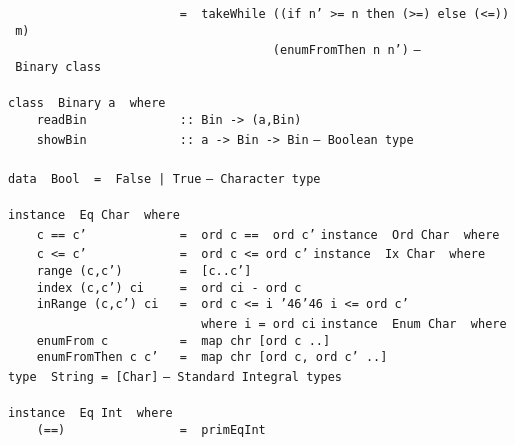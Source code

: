 \mbox{\tt \ \ \ \ \ \ \ \ \ \ \ \ \ \ \ \ \ \ \ \ \ \ \ \ =\ \ takeWhile\ ((if\ n'\ >=\ n\ then\ (>=)\ else\ (<=))\ m)}\\
\mbox{\tt \ \ \ \ \ \ \ \ \ \ \ \ \ \ \ \ \ \ \ \ \ \ \ \ \ \ \ \ \ \ \ \ \ \ \ \ \ (enumFromThen\ n\ n')}
\eprogB\noindent\bprogB
\mbox{\tt --\ Binary\ class}\\
\mbox{\tt }\\
\mbox{\tt class\ \ Binary\ a\ \ where}\\
\mbox{\tt \ \ \ \ readBin\ \ \ \ \ \ \ \ \ \ \ \ \ ::\ Bin\ ->\ (a,Bin)}\\
\mbox{\tt \ \ \ \ showBin\ \ \ \ \ \ \ \ \ \ \ \ \ ::\ a\ ->\ Bin\ ->\ Bin}
\eprogB\noindent\bprogB
\mbox{\tt --\ Boolean\ type}\\
\mbox{\tt }\\
\mbox{\tt data\ \ Bool\ \ =\ \ False\ |\ True}
\eprogB\noindent\bprogB
\mbox{\tt --\ Character\ type}\\
\mbox{\tt }\\
\mbox{\tt instance\ \ Eq\ Char\ \ where}\\
\mbox{\tt \ \ \ \ c\ ==\ c'\ \ \ \ \ \ \ \ \ \ \ \ \ =\ \ ord\ c\ ==\ \ ord\ c'}
\eprogB\noindent\bprogB
\mbox{\tt instance\ \ Ord\ Char\ \ where}\\
\mbox{\tt \ \ \ \ c\ <=\ c'\ \ \ \ \ \ \ \ \ \ \ \ \ =\ \ ord\ c\ <=\ ord\ c'}
\eprogB\noindent\bprogB
\mbox{\tt instance\ \ Ix\ Char\ \ where}\\
\mbox{\tt \ \ \ \ range\ (c,c')\ \ \ \ \ \ \ \ =\ \ [c..c']}\\
\mbox{\tt \ \ \ \ index\ (c,c')\ ci\ \ \ \ \ =\ \ ord\ ci\ -\ ord\ c}\\
\mbox{\tt \ \ \ \ inRange\ (c,c')\ ci\ \ \ =\ \ ord\ c\ <=\ i\ {\char'46}{\char'46}\ i\ <=\ ord\ c'}\\
\mbox{\tt \ \ \ \ \ \ \ \ \ \ \ \ \ \ \ \ \ \ \ \ \ \ \ \ \ \ \ where\ i\ =\ ord\ ci}
\eprogB\noindent\bprogB
\mbox{\tt instance\ \ Enum\ Char\ \ where}\\
\mbox{\tt \ \ \ \ enumFrom\ c\ \ \ \ \ \ \ \ \ \ =\ \ map\ chr\ [ord\ c\ ..]}\\
\mbox{\tt \ \ \ \ enumFromThen\ c\ c'\ \ \ =\ \ map\ chr\ [ord\ c,\ ord\ c'\ ..]}
\eprogB\noindent\bprogB
\mbox{\tt type\ \ String\ =\ [Char]}
\eprogB\noindent\bprogB
\mbox{\tt --\ Standard\ Integral\ types}\\
\mbox{\tt }\\
\mbox{\tt instance\ \ Eq\ Int\ \ where}\\
\mbox{\tt \ \ \ \ (==)\ \ \ \ \ \ \ \ \ \ \ \ \ \ \ \ =\ \ primEqInt}
